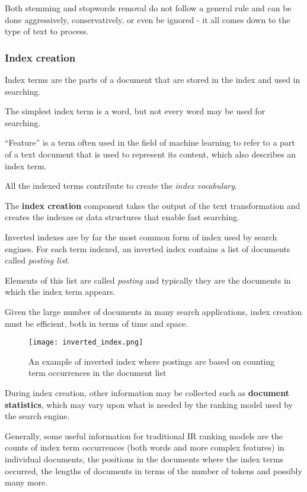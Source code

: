 Both stemming and stopwords removal do not follow a general rule and can be done aggressively, conservatively, or even be ignored - it all comes down to the type of text to process.

\subsubsection{Index creation}

Index terms are the parts of a document that are stored in the index and used in searching.

The simplest index term is a word, but not every word may be used for searching.

``Feature'' is a term often used in the field of machine learning to refer to a part of a text document that is used to represent its content, which also describes an index term.

All the indexed terms contribute to create the \textit{index vocabulary}.

The \textbf{index creation} component takes the output of the text transformation and creates the indexes or data structures that enable fast searching.

Inverted indexes are by far the most common form of index used by search engines. For each term indexed, an inverted index contains a list of documents called \textit{posting list}.

Elements of this list are called \textit{posting} and typically they are the documents in which the index term appears.

Given the large number of documents in many search applications, index creation must be efficient, both in terms of time and space.

\begin{figure}
  \centering
  \texttt{[image: inverted\_index.png]}
  \caption{An example of inverted index where postings are based on counting term occurrences in the document list}
  \label{fig:indexing}
\end{figure}

During index creation, other information may be collected such as \textbf{document statistics}, which may vary upon what is needed by the ranking model used by the search engine.

Generally, some useful information for traditional IR ranking models are the counts of index term occurrences (both words and more complex features) in individual documents, the positions in the documents where the index terms occurred, the lengths of documents in terms of the number of tokens and possibly many more.

